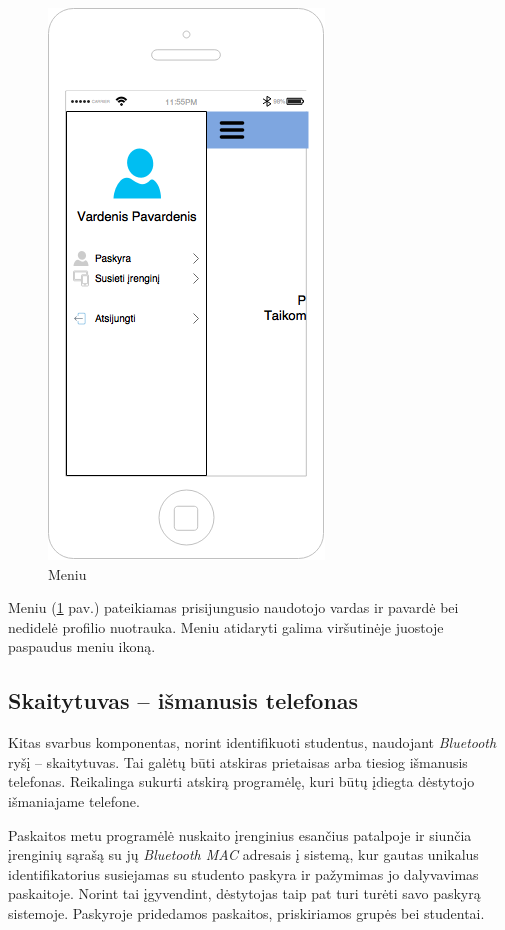 \documentclass{VUMIFPSkursinis}
\begin{document}
\begin{figure}[H]
	\centering
	\includegraphics[scale=0.5]{img/kursinio_app_menu}
	\caption{Meniu}
	\label{img:menuView}
\end{figure}

Meniu (\ref{img:menuView} pav.) pateikiamas prisijungusio naudotojo vardas ir pavardė bei nedidelė profilio nuotrauka. Meniu atidaryti galima viršutinėje juostoje paspaudus meniu ikoną.

\subsection{Skaitytuvas – išmanusis telefonas} \label{TeacherApp}
Kitas svarbus komponentas, norint identifikuoti studentus, naudojant \textit{Bluetooth} ryšį – skaitytuvas. Tai galėtų būti atskiras prietaisas arba tiesiog išmanusis telefonas. Reikalinga sukurti atskirą programėlę, kuri būtų įdiegta dėstytojo išmaniajame telefone.

Paskaitos metu programėlė nuskaito įrenginius esančius patalpoje ir siunčia įrenginių sąrašą su jų \textit{Bluetooth MAC} adresais į sistemą, kur gautas unikalus identifikatorius susiejamas su studento paskyra ir pažymimas jo dalyvavimas paskaitoje. Norint tai įgyvendint, dėstytojas taip pat turi turėti savo paskyrą sistemoje. Paskyroje pridedamos paskaitos, priskiriamos grupės bei studentai.
\end{document}

